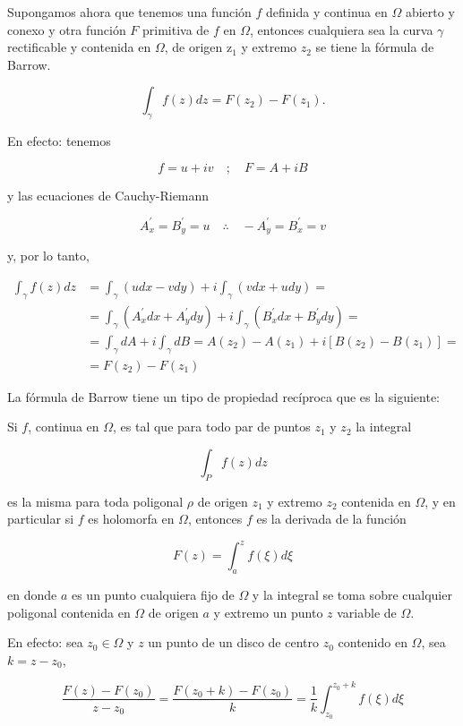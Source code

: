 \documentclass[10pt]{article}
\theoremstyle{plain}
\theoremstyle{definition}
\theoremstyle{remark}
\begin{document}
Supongamos ahora que tenemos una función $f$ definida y continua en $\Omega$ abierto y conexo y otra función $F$ primitiva de $f$ en $\Omega$, entonces cualquiera sea la curva $\gamma$ rectificable y contenida en $\Omega$, de origen $\mathrm{z}_{1}$ y extremo $z_{2}$ se tiene la fórmula de Barrow.

$$
\int_{\gamma} f(z) d z=F\left(z_{2}\right)-F\left(z_{1}\right) .
$$

En efecto: tenemos

$$
f=u+i v \quad ; \quad F=A+i B
$$

y las ecuaciones de Cauchy-Riemann

$$
A_{x}^{\prime}=B_{y}^{\prime}=u \quad \therefore \quad-A_{y}^{\prime}=B_{x}^{\prime}=v
$$

y, por lo tanto,

$$
\begin{aligned}
\int_{\gamma} f(z) d z & =\int_{\gamma}(u d x-v d y)+i \int_{\gamma}(v d x+u d y)= \\
& =\int_{\gamma}\left(A_{x}^{\prime} d x+A_{y}^{\prime} d y\right)+i \int_{\gamma}\left(B_{x}^{\prime} d x+B_{y}^{\prime} d y\right)= \\
& =\int_{\gamma} d A+i \int_{\gamma} d B=A\left(z_{2}\right)-A\left(z_{1}\right)+i\left[B\left(z_{2}\right)-B\left(z_{1}\right)\right]= \\
& =F\left(z_{2}\right)-F\left(z_{1}\right)
\end{aligned}
$$

La fórmula de Barrow tiene un tipo de propiedad recíproca que es la siguiente:

Si $f$, continua en $\Omega$, es tal que para todo par de puntos $z_{1}$ y $z_{2}$ la integral

$$
\int_{P} f(z) d z
$$

es la misma para toda poligonal $\rho$ de origen $z_{1}$ y extremo $z_{2}$ contenida en $\Omega$, y en particular si $f$ es holomorfa en $\Omega$, entonces $f$ es la derivada de la función

$$
F(z)=\int_{a}^{z} f(\xi) d \xi
$$

en donde $a$ es un punto cualquiera fijo de $\Omega$ y la integral se toma sobre cualquier poligonal contenida en $\Omega$ de origen $a$ y extremo un punto $z$ variable de $\Omega$.

En efecto: sea $z_{0} \in \Omega$ y $z$ un punto de un disco de centro $z_{0}$ contenido en $\Omega$, sea $k=z-z_{0}$,

$$
\frac{F(z)-F\left(z_{0}\right)}{z-z_{0}}=\frac{F\left(z_{0}+k\right)-F\left(z_{0}\right)}{k}=\frac{1}{k} \int_{z_{0}}^{z_{0}+k} f(\xi) d \xi
$$
\end{document}
